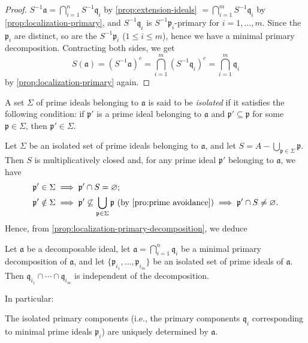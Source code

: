 \begin{proof}
    $S^{-1}\mathfrak{a} = \bigcap_{i=1}^n S^{-1}\mathfrak{q}_i$ by \eqref{prop:extension-ideals} $= \bigcap_{i=1}^m S^{-1}\mathfrak{q}_i$ by \eqref{prop:localization-primary}, and $S^{-1}\mathfrak{q}_i$ is $S^{-1}\mathfrak{p}_i$-primary for $i = 1, \dots, m$. Since the $\mathfrak{p}_i$ are distinct, so are the $S^{-1}\mathfrak{p}_i$ ($1 \le i \le m$), hence we have a minimal primary decomposition. Contracting both sides, we get
    \[
    S(\mathfrak{a}) = (S^{-1}\mathfrak{a})^c = \bigcap_{i=1}^m (S^{-1}\mathfrak{q}_i)^c = \bigcap_{i=1}^m \mathfrak{q}_i
    \]
    by \eqref{prop:localization-primary} again. 
\end{proof}

A set $\Sigma$ of prime ideals belonging to $\mathfrak{a}$ is said to be \emph{isolated} if it satisfies the following condition: if $\mathfrak{p}'$ is a prime ideal belonging to $\mathfrak{a}$ and $\mathfrak{p}' \subseteq \mathfrak{p}$ for some $\mathfrak{p} \in \Sigma$, then $\mathfrak{p}' \in \Sigma$.

Let $\Sigma$ be an isolated set of prime ideals belonging to $\mathfrak{a}$, and let $S = A - \bigcup_{\mathfrak{p} \in \Sigma} \mathfrak{p}$. Then $S$ is multiplicatively closed and, for any prime ideal $\mathfrak{p}'$ belonging to $\mathfrak{a}$, we have
\begin{align*}
\mathfrak{p}' \in \Sigma &\implies \mathfrak{p}' \cap S = \varnothing; \\
\mathfrak{p}' \notin \Sigma &\implies \mathfrak{p}' \not\subseteq \bigcup_{\mathfrak{p} \in \Sigma} \mathfrak{p} \ (\text{by \eqref{pro:prime avoidance}}) \implies \mathfrak{p}' \cap S \neq \varnothing.
\end{align*}
Hence, from \eqref{prop:localization-primary-decomposition}, we deduce

\begin{theorem}\label{thm:second-uniqueness}
    Let $\mathfrak{a}$ be a decomposable ideal, let $\mathfrak{a} = \bigcap_{i=1}^n \mathfrak{q}_i$ be a minimal primary decomposition of $\mathfrak{a}$, and let $\{\mathfrak{p}_{i_1}, \dots, \mathfrak{p}_{i_m}\}$ be an isolated set of prime ideals of $\mathfrak{a}$. Then $\mathfrak{q}_{i_1} \cap \cdots \cap \mathfrak{q}_{i_m}$ is independent of the decomposition.
\end{theorem}

In particular:

\begin{corollary}\label{cor:isolated-primary-components-unique}
    The isolated primary components (i.e., the primary components $\mathfrak{q}_i$ corresponding to minimal prime ideals $\mathfrak{p}_i$) are uniquely determined by $\mathfrak{a}$.
\end{corollary}

